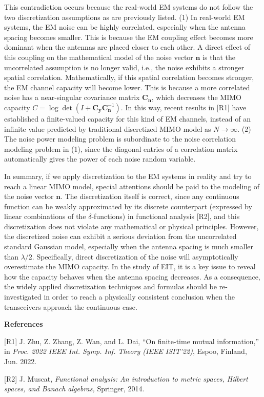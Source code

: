 \documentclass[a4paper,12pt]{article}
\begin{document}
{\quad This contradiction occurs because the real-world EM systems do not follow the two discretization assumptions as are previously listed. (1) In real-world EM systems, the EM noise can be highly correlated, especially when the antenna spacing becomes smaller. This is because the EM coupling effect becomes more dominant when the antennas are placed closer to each other. A direct effect of this coupling on the mathematical model of the noise vector $\bm n$ is that the uncorrelated assumption is no longer valid, i.e., the noise exhibits a stronger spatial correlation. Mathematically, if this spatial correlation becomes stronger, the EM channel capacity will become lower. This is because a more correlated noise has a near-singular covariance matrix ${\bm C}_{\bm n}$, which decreases the MIMO capacity $C=\log\det(I+{\bm C}_{\bm y}{\bm C}_{\bm n}^{-1})$. In this way, recent results in [R1] have established a finite-valued capacity for this kind of EM channels, instead of an infinite value predicted by traditional discretized MIMO model as $N\to\infty$. (2) The noise power modeling problem is subordinate to the noise correlation modeling problem in (1), since the diagonal entries of a correlation matrix automatically gives the power of each noise random variable. 

\quad In summary, if we apply discretization to the EM systems in reality and try to reach a linear MIMO model, special attentions should be paid to the modeling of the noise vector ${\bm n}$. The discretization itself is correct, since any continuous function can be weakly approximated by its discrete counterpart (expressed by linear combinations of the $\delta$-functions) in functional analysis [R2], and this discretization does not violate any mathematical or physical principles. However, the discretized noise can exhibit a serious deviation from the uncorrelated standard Gaussian model, especially when the antenna spacing is much smaller than $\lambda/2$. Specifically, direct discretization of the noise will asymptotically overestimate the MIMO capacity. In the study of EIT, it is a key issue to reveal how the capacity behaves when the antenna spacing decreases. As a consequence, the widely applied discretization techniques and formulas should be re-investigated in order to reach a physically consistent conclusion when the transceivers approach the continuous case. 


{\bf References}

[R1] J. Zhu, Z. Zhang, Z. Wan, and L. Dai, ``On finite-time mutual information,'' in {\it Proc. 2022 IEEE Int. Symp. Inf. Theory (IEEE ISIT'22)}, Espoo, Finland, Jun. 2022. 

[R2] J. Muscat, {\it Functional analysis: An introduction to metric spaces, Hilbert spaces, and Banach algebras,} Springer, 2014. 

}
\end{document}

